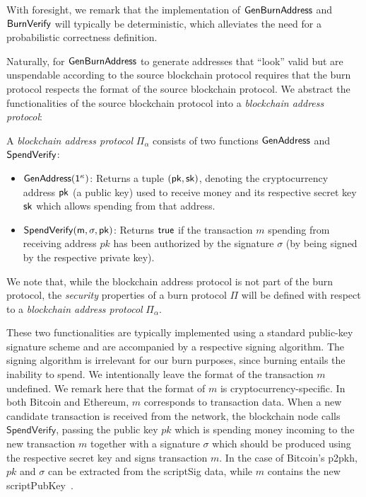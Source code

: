 With foresight, we remark that the implementation of $\mathsf{Gen}\-\mathsf{Burn}\-\mathsf{Address}$ and $\mathsf{BurnVerify}$ will typically be deterministic, which alleviates the need for a probabilistic correctness definition.

Naturally, for $\mathsf{Gen}\-\mathsf{Burn}\-\mathsf{Address}$ to generate addresses that ``look'' valid but are unspendable according to the source blockchain protocol requires that the burn protocol respects the format of the source blockchain protocol. We abstract the functionalities of the source blockchain protocol into a \emph{blockchain address protocol}:

\begin{definition}
  A \emph{blockchain address protocol} $\Pi_\alpha$ consists of two functions $\sf{GenAddress}$ and $\sf{SpendVerify}$:

  \begin{itemize}
    \item $\sf{GenAddress}(1^\kappa)$: Returns a tuple $(\sf{pk}, \sf{sk})$, denoting the cryptocurrency address $\sf{pk}$ (a public key) used to receive money and its respective secret key $\sf{sk}$ which allows spending from that address.

    \item $\sf{SpendVerify}(m, \sigma, pk)$: Returns $\sf{true}$ if the transaction $m$ spending from receiving address $pk$ has been authorized by the signature $\sigma$ (by being signed by the respective private key).
  \end{itemize}
\end{definition}

We note that, while the blockchain address protocol is not part of the burn protocol, the \emph{security} properties of a burn protocol $\Pi$ will be defined with respect to a \emph{blockchain address protocol} $\Pi_\alpha$.

These two functionalities are typically implemented using a standard public-key signature scheme and are accompanied by a respective signing algorithm. The signing algorithm is irrelevant for our burn purposes, since burning entails the inability to spend. We intentionally leave the format of the transaction $m$ undefined. We remark here that the format of $m$ is cryptocurrency-specific. In both Bitcoin and Ethereum, $m$ corresponds to transaction data. When a new candidate transaction is received from the network, the blockchain node calls $\textsf{SpendVerify}$, passing the public key $pk$ which is spending money incoming to the new transaction $m$ together with a signature $\sigma$ which should be produced using the respective secret key and signs transaction $m$. In the case of Bitcoin's p2pkh, $pk$ and $\sigma$ can be extracted from the scriptSig data, while $m$ contains the new scriptPubKey~\cite{bitcoin-dev-guide}.


